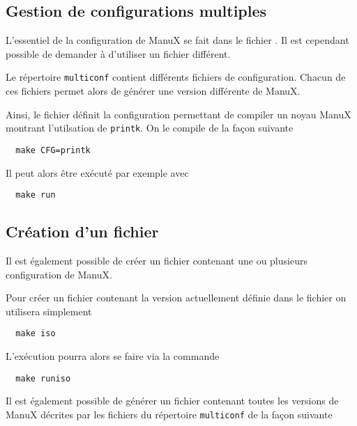 \subsection{Gestion de configurations multiples}

   L'essentiel de la configuration de ManuX se fait dans le fichier
. Il est cependant possible de
demander à \make d'utiliser un fichier différent.

   Le répertoire {\tt multiconf} contient différents fichiers de
configuration. Chacun de ces fichiers permet alors de générer une
version différente de ManuX.

   Ainsi, le fichier  définit la
configuration permettant de compiler un noyau ManuX montrant
l'utilsation de {\tt printk}. On le compile de la façon suivante

\begin{lstlisting}
  make CFG=printk
\end{lstlisting}

   Il peut alors être exécuté par exemple avec

\begin{lstlisting}
  make run
\end{lstlisting}

%
\subsection{Création d'un fichier \iso}

   Il est également possible de créer un fichier \iso contenant une ou
plusieurs configuration de ManuX.

   Pour créer un fichier \iso contenant la version actuellement
définie dans le fichier  on
utilisera simplement

\begin{lstlisting}
  make iso
\end{lstlisting}

   L'exécution pourra alors se faire via la commande

\begin{lstlisting}
  make runiso
\end{lstlisting}

   Il est également possible de générer un fichier \iso contenant
toutes les versions de ManuX décrites par les fichiers du répertoire
\lstinline!multiconf! de la façon suivante

